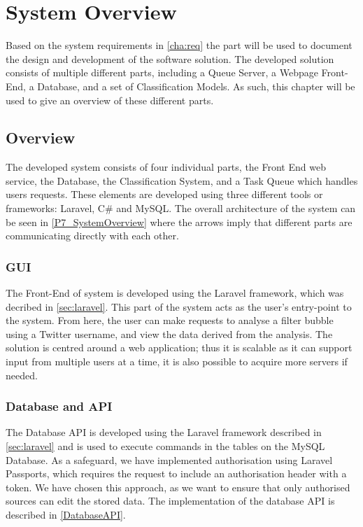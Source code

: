 \chapter{System Overview}\label{ch:sysview}
Based on the system requirements in \autoref{cha:req} the part will be used to
document the design and development of the software solution. The developed
solution consists of multiple different parts, including a Queue Server, a
Webpage Front-End, a Database, and a set of Classification Models. As such,
this chapter will be used to give an overview of these different parts.

\section{Overview}
The developed system consists of four individual parts, the Front End web
service, the Database, the Classification System, and a Task Queue which handles
users requests. These elements are developed using three different tools or
frameworks: Laravel, C\# and MySQL. The overall architecture of the system can
be seen in \autoref{P7_SystemOverview} where the arrows imply that different
parts are communicating directly with each other.
 

\subsection{GUI} %
The Front-End of system is developed using the Laravel framework, which was
decribed in \autoref{sec:laravel}. This part of the system acts as the user's
entry-point to the system. From here, the user can make requests to analyse a
filter bubble using a Twitter username, and view the data derived from the
analysis. The solution is centred around a web application; thus it is scalable
as it can support input from multiple users at a time, it is also possible to
acquire more servers if needed.

\subsection{Database and API}
The Database \ac{API} is developed using the Laravel framework described in
\autoref{sec:laravel} and is used to execute commands in the tables on the MySQL
Database. As a safeguard, we have implemented authorisation using Laravel
Passports, which requires the request to include an authorisation header with a
 token. We have chosen this approach, as we want to ensure that
only authorised sources can edit the stored data. The implementation of the
database \ac{API} is described in \autoref{DatabaseAPI}.


